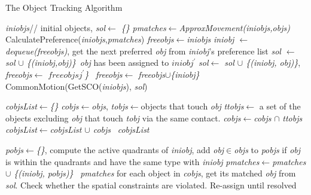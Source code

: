 \documentclass[letterpaper]{article}
\begin{document}
\begin{algorithm}[!]\footnotesize
\caption{The Object Tracking Algorithm}\label{algo}
\begin{algorithmic}[1]
\State \emph{iniobjs}// initial objects, \emph{sol$\leftarrow$ \{\}}
\State \emph{pmatches$\leftarrow$ApproxMovement(iniobjs,objs)} \label{SetPossible}
\State CalculatePreference(\emph{iniobjs},\emph{pmatches})\label{calPref}
\State \emph{freeobjs$\leftarrow$iniobjs}
\label{stableMarriage}
\State \emph{iniobj $\leftarrow$ dequeue(freeobjs)}, get the next preferred \emph{obj} from \emph{iniobj}'s preference list  
   \emph{sol $\leftarrow$ sol $\cup$ \{(iniobj,obj)\}}
  \Else\,\emph{obj} has been assigned to \emph{$iniobj^{\prime}$}
   \emph{sol$\leftarrow$ sol $\cup$ \{(iniobj, obj)\}}, \emph{freeobjs$\leftarrow$ $freeobjsj^{\prime}$\}}
  \Else\, 
   \emph{freeobjs$\leftarrow$ freeobjs$\cup$\{iniobj\}}
\EndIf 
\EndIf
\EndWhile
\State CommonMotion(GetSCO(\emph{iniobjs}), \emph{sol})
\EndProcedure

\label{getSCO}
\State \emph{cobjsList$\leftarrow$\{\}}
\State \emph{cobjs$\leftarrow$objs}, \emph{tobjs}$\leftarrow$objects that touch \emph{obj}
\State \emph{ttobjs}$\leftarrow$ a set of the objects excluding \emph{obj} that touch \emph{tobj} via the same contact.
\State \emph{cobjs}$\leftarrow$\emph{cobjs} $\cap$ \emph{ttobjs}
\EndFor
\State \emph{cobjsList}$\leftarrow$\emph{cobjsList $\cup$ cobjs}
\EndFor\,
\Return \emph{cobjsList}
\EndProcedure

\label{MA}
\State \emph{pobjs$\leftarrow$\{\}}, compute the active quadrants of \emph{iniobj}, add \emph{obj$\in$objs} to \emph{pobjs} if \emph{obj} is within the quadrants and have the same type with \emph{iniobj} 
\State \emph{pmatches$\leftarrow$pmatches $\cup$ \{(iniobj, pobjs)\}}
\EndFor\,
\Return \emph{pmatches}
\EndProcedure
{}\label{CommonMotion}
\State for each object in \emph{cobjs}, get its matched \emph{obj} from \emph{sol}. Check whether the spatial constraints are violated. Re-assign until resolved  
\EndFor
\EndProcedure
\end{algorithmic}
\end{algorithm}

\newpage


 
\end{document}
